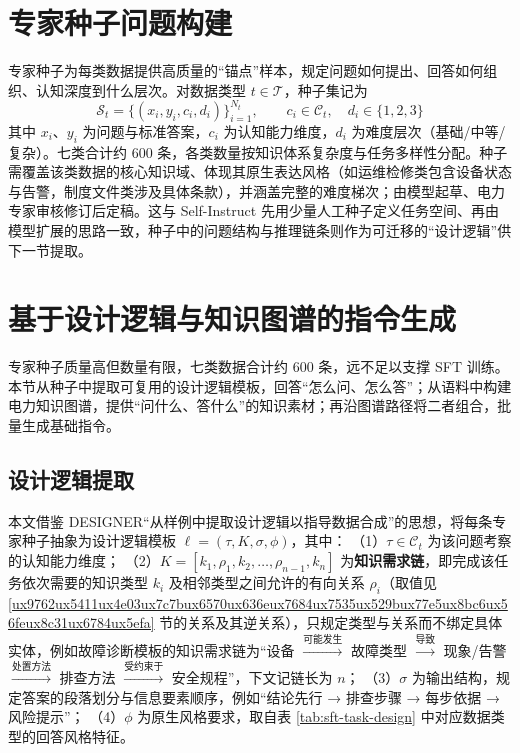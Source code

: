 \documentclass[fontset=fandol,type=master,campus=shenzhen,etitleauto=true]{hithesisbook}
\begin{document}
\section{专家种子问题构建}\label{ux4e13ux5bb6ux79cdux5b50ux95eeux9898ux6784ux5efa}

专家种子为每类数据提供高质量的“锚点”样本，规定问题如何提出、回答如何组织、认知深度到什么层次。对数据类型 $t \in \mathcal{T}$，种子集记为
\begin{equation}
\mathcal{S}_t = \{(x_i, y_i, c_i, d_i)\}_{i=1}^{N_t}, \qquad c_i \in \mathcal{C}_t, \quad d_i \in \{1, 2, 3\}
\end{equation}
其中 $x_i$、$y_i$ 为问题与标准答案，$c_i$ 为认知能力维度，$d_i$ 为难度层次（基础/中等/复杂）。七类合计约 600 条，各类数量按知识体系复杂度与任务多样性分配。种子需覆盖该类数据的核心知识域、体现其原生表达风格（如运维检修类包含设备状态与告警，制度文件类涉及具体条款），并涵盖完整的难度梯次；由模型起草、电力专家审核修订后定稿。这与 Self-Instruct 先用少量人工种子定义任务空间、再由模型扩展的思路一致\cite{ref24}，种子中的问题结构与推理链条则作为可迁移的“设计逻辑”\cite{ref54}供下一节提取。

\section{基于设计逻辑与知识图谱的指令生成}\label{ux57faux4e8eux8bbeux8ba1ux903bux8f91ux63d0ux53d6ux4e0eux77e5ux8bc6ux56feux8c31ux7684ux4efbux52a1ux6570ux636eux751fux6210}

专家种子质量高但数量有限，七类数据合计约 600 条，远不足以支撑 SFT 训练。本节从种子中提取可复用的设计逻辑模板，回答“怎么问、怎么答”；从语料中构建电力知识图谱，提供“问什么、答什么”的知识素材；再沿图谱路径将二者组合，批量生成基础指令。

\subsection{设计逻辑提取}\label{ux4eceux4e13ux5bb6ux79cdux5b50ux4e2dux63d0ux53d6ux8bbeux8ba1ux903bux8f91}

本文借鉴 DESIGNER“从样例中提取设计逻辑以指导数据合成”的思想\cite{ref54}，将每条专家种子抽象为设计逻辑模板 $\ell = (\tau, K, \sigma, \phi)$，其中：
（1）$\tau \in \mathcal{C}_t$ 为该问题考察的认知能力维度；
（2）$K = [k_1, \rho_1, k_2, \ldots, \rho_{n-1}, k_n]$ 为\textbf{知识需求链}，即完成该任务依次需要的知识类型 $k_i$ 及相邻类型之间允许的有向关系 $\rho_i$（取值见 \ref{ux9762ux5411ux4e03ux7c7bux6570ux636eux7684ux7535ux529bux77e5ux8bc6ux56feux8c31ux6784ux5efa} 节的关系及其逆关系），只规定类型与关系而不绑定具体实体，例如故障诊断模板的知识需求链为“设备 $\xrightarrow{\text{可能发生}}$ 故障类型 $\xrightarrow{\text{导致}}$ 现象/告警 $\xrightarrow{\text{处置方法}}$ 排查方法 $\xrightarrow{\text{受约束于}}$ 安全规程”，下文记链长为 $n$；
（3）$\sigma$ 为输出结构，规定答案的段落划分与信息要素顺序，例如“结论先行 → 排查步骤 → 每步依据 → 风险提示”；
（4）$\phi$ 为原生风格要求，取自表 \ref{tab:sft-task-design} 中对应数据类型的回答风格特征。
\end{document}
